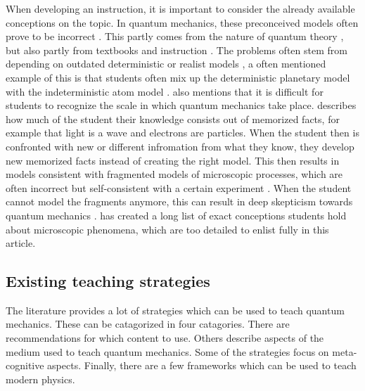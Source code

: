 \documentclass[11pt,twoside]{report} %
\begin{document}
When developing an instruction, it is important to consider the already available conceptions on the topic. In quantum mechanics, these preconceived models often prove to be incorrect \cite{thacker,papaphotis2,asikainen}. This partly comes from the nature of quantum theory \cite{papaphotis2}, but also partly from textbooks and instruction \cite{papaphotis2, hubber}. The problems often stem from depending on outdated deterministic or realist models \cite{papaphotis1,papaphotis2,hubber}, a often mentioned example of this is that students often mix up the deterministic planetary model with the indeterministic atom model \cite{dori,papaphotis1,papaphotis2,muller,henriksen,hubber}.  also mentions that it is difficult for students to recognize the scale in which quantum mechanics take place.  describes how much of the student their knowledge consists out of memorized facts, for example that light is a wave and electrons are particles. When the student then is confronted with new or different infromation from what they know, they develop new memorized facts instead of creating the right model. This then results in models consistent with fragmented models of microscopic processes, which are often incorrect but self-consistent with a certain experiment \cite{thacker,hubber}. When the student cannot model the fragments anymore, this can result in deep skepticism towards quantum mechanics \cite{levrini, henriksen, barnes}.  has created a long list of exact conceptions students hold about microscopic phenomena, which are too detailed to enlist fully in this article.

\subsection{Existing teaching strategies}

The literature provides a lot of strategies which can be used to teach quantum mechanics. These can be catagorized in four catagories. There are recommendations for which content to use. Others describe aspects of the medium used to teach quantum mechanics. Some of the strategies focus on meta-cognitive aspects. Finally, there are a few frameworks which can be used to teach modern physics.
\end{document}
